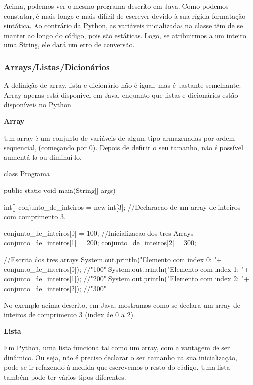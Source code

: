 \documentclass[11pt,openright,twoside]{report}
\begin{document}
Acima, podemos ver o mesmo programa descrito em Java. Como podemos constatar, é mais longo e mais difícil de escrever devido à sua rígida formatação sintática. Ao contrário da Python, as variáveis inicializadas na classe têm de se manter ao longo do código, pois são estáticas. Logo, se atribuirmos a um inteiro uma String, ele dará um erro de conversão.
\medskip

\subsubsection{Arrays/Listas/Dicionários}
A definição de array, lista e dicionário não é igual, mas é bastante semelhante. Array apenas está disponível em Java, enquanto que listas e dicionários estão disponíveis no Python.
\medskip

\textbf{Array}
\smallskip

Um array é um conjunto de variáveis de algum tipo armazenadas por ordem sequencial, (começando por 0). Depois de definir o seu tamanho, não é possível aumentá-lo ou diminuí-lo.

\begin{Java}
class Programa {

  public static void main(String[] args) { 
	
        int[] conjunto_de_inteiros = new int[3];								//Declaracao de um array de inteiros com comprimento 3.
           
        conjunto_de_inteiros[0] = 100;											//Inicializacao dos tres Arrays
        conjunto_de_inteiros[1] = 200;
        conjunto_de_inteiros[2] = 300;

		//Escrita dos tres arrays
        System.out.println("Elemento com index 0: "+ conjunto_de_inteiros[0]);	//"100"
        System.out.println("Elemento com index 1: "+ conjunto_de_inteiros[1]);	//"200"
        System.out.println("Elemento com index 2: "+ conjunto_de_inteiros[2]);	//"300"

  }
}
\end{Java}
\smallskip

No exemplo acima descrito, em Java, mostramos como se declara um array de inteiros de comprimento 3 (index de 0 a 2).
\medskip

\textbf{Lista}
\smallskip

Em Python, uma lista funciona tal como um array, com a vantagem de ser dinâmico. Ou seja, não é preciso declarar o seu tamanho na sua inicialização, pode-se ir refazendo à medida que escrevemos o resto do código. Uma lista também pode ter vários tipos diferentes.
\end{document}
